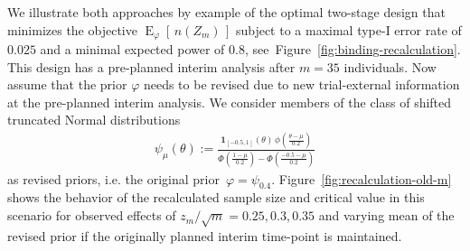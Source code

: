 \documentclass{article}
\newcommand{\E}{\ensuremath{\operatorname{E}}}
\begin{document}
We illustrate both approaches by example of the optimal two-stage design that minimizes the objective 
$\E_\varphi[\,n(Z_m)\,]$ subject to a maximal type-I error rate of $0.025$ and a minimal expected power of $0.8$, see~Figure~\ref{fig:binding-recalculation}.  
This design has a pre-planned interim analysis after $m=35$ individuals.
Now assume that
the prior $\varphi$ needs to be revised due to new trial-external 
information at the pre-planned interim analysis.
We consider members of the class of shifted truncated Normal distributions 
\begin{align}
    \psi_{\mu}(\theta) := \frac{\displaystyle \boldsymbol{1}_{[-0.5, 1]}(\theta)\,\phi\left(\frac{\theta - \mu}{0.2}\right)}{\displaystyle \Phi\left(\frac{1 - \mu}{0.2}\right) - \Phi\left(\frac{-0.5 - \mu}{0.2}\right)}
\end{align}
as revised priors, i.e. the original prior~$\varphi=\psi_{0.4}$.
Figure~\ref{fig:recalculation-old-m} shows the behavior of the recalculated sample size and critical value in this scenario for observed effects of $z_m/\sqrt{m}=0.25, 0.3, 0.35$ and varying mean of the revised prior if the originally planned interim time-point is maintained.
\end{document}
